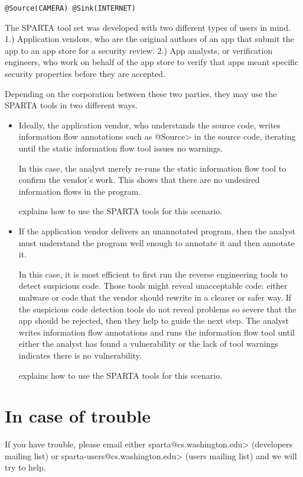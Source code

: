 \begin{Verbatim}
@Source(CAMERA) @Sink(INTERNET)
\end{Verbatim}

The SPARTA tool set was developed with two different types of users in mind. 
1.)  Application vendors, who are the original authors of an app that submit the app 
to an app store for a security review. 2.) App analysts, or verification engineers, 
who work on behalf of the app store
to verify that apps meant specific security properties before they are accepted.  


Depending on the corporation between these two parties, they may use the SPARTA tools 
in two different ways.

\begin{itemize}
\item
  Ideally, the application vendor, who understands the source code,
  writes information flow annotations such as \<@Source> in the source
  code, iterating until the static information flow tool issues no warnings.

  In this case, the analyst merely re-runs the static information flow tool
  to confirm the vendor's work.  This shows that there are no undesired
  information flows in the program.

   explains how to use the SPARTA tools for
  this scenario.

\item
  If the application vendor delivers an unannotated program, then the
  analyst must understand the program well enough to annotate it and then
  annotate it.

  In this case, it is most efficient to first run the reverse engineering
  tools to detect suspicious code.  Those tools might reveal unacceptable
  code: either malware or code that the vendor
  should rewrite in a clearer or safer way.  If the suspicious code
  detection tools do not reveal problems so severe that the app should be
  rejected, then they help to guide the next step.   The analyst writes
  information flow annotations and runs the information
  flow tool until either the analyst has found a vulnerability or the lack
  of tool warnings indicates there is no vulnerability.

   explains how to use the SPARTA tools for
  this scenario.
\end{itemize}


\section{In case of trouble\label{sec:incaseoftrouble}}

\begin{sloppypar}
If you have trouble, please email either
\<sparta@cs.washington.edu>
(developers mailing list) or
\<sparta-users@cs.washington.edu> (users
mailing list) and we will try to help.
\end{sloppypar}





